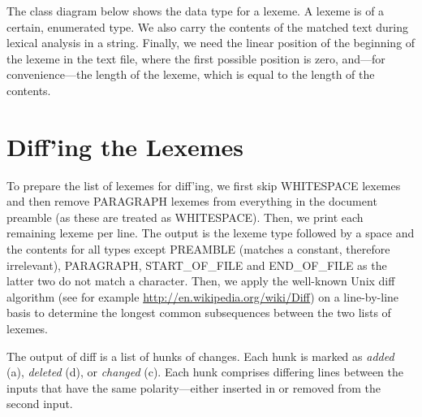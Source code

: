 The class diagram below shows the data type for a lexeme.  A lexeme is of a certain, enumerated type.  We also carry the contents of the matched text during lexical analysis in a string.  Finally, we need the linear position of the beginning of the lexeme in the text file, where the first possible position is zero, and---for convenience---the length of the lexeme, which is equal to the length of the contents.


\section{Diff'ing the Lexemes}

To prepare the list of lexemes for diff'ing, we first skip WHITESPACE lexemes and then remove PARAGRAPH lexemes from everything in the document preamble (as these are treated as WHITESPACE).  Then, we print each remaining lexeme per line.  The output is the lexeme type followed by a space and the contents for all types except PREAMBLE (matches a constant, therefore irrelevant), PARAGRAPH, START\_OF\_FILE and END\_OF\_FILE as the latter two do not match a character.  Then, we apply the well-known Unix diff algorithm (see for example \url{http://en.wikipedia.org/wiki/Diff}) on a line-by-line basis to determine the longest common subsequences between the two lists of lexemes.

The output of diff is a list of hunks of changes.  Each hunk is marked as \textit{added} (a), \textit{deleted} (d), or \textit{changed} (c).  Each hunk comprises differing lines between the inputs that have the same polarity---either inserted in or removed from the second input.

